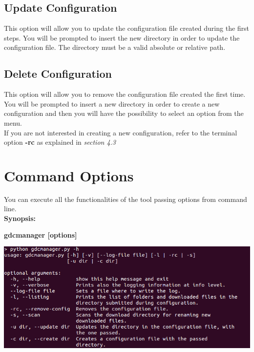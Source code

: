 \documentclass[hidelinks,12pt]{article}
\begin{document}

\subsection{Update Configuration}
This option will allow you to update the configuration file created during the first steps. You will be prompted to insert the new directory in order to update the configuration file. The directory must be a valid absolute or relative path.

\subsection{Delete Configuration}

This option will allow you to remove the configuration file created the first time.
You will be prompted to insert a new directory in order to create a new configuration and then you will have the possibility
to select an option from the menu. \\
If you are not interested in creating a new configuration, refer to the terminal option \textbf{-rc} as explained in \textit{section 4.3}

\clearpage


\section{Command Options}

You can execute all the functionalities of the tool passing options from command line.\\

\textbf{Synopsis:}
\begin{center}
\textbf{gdcmanager [options]}
\end{center}

\begin{center}
\includegraphics[scale = 0.6]{help_picture.png}\\[0.5 cm]
\end{center}
\end{document}
